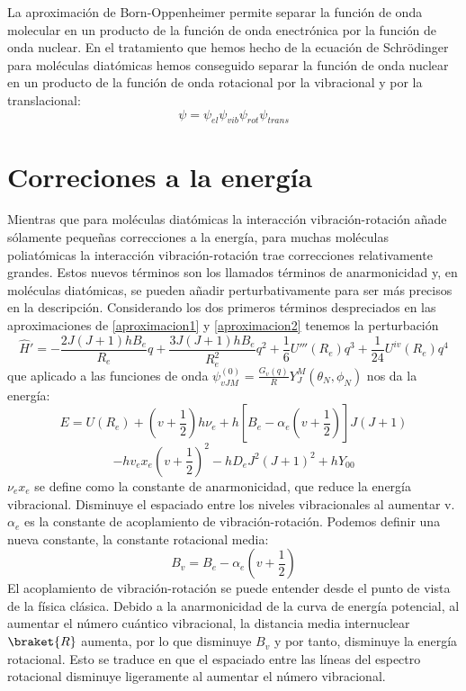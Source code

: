 \documentclass[a4paper]{article}
\begin{document}
La aproximación de Born-Oppenheimer permite separar la función de onda molecular en un producto de la función de onda enectrónica por la función de onda nuclear. En el tratamiento que hemos hecho de la ecuación de Schrödinger para moléculas diatómicas hemos conseguido separar la función de onda nuclear en un producto de la función de onda rotacional por la vibracional y por la translacional:
\begin{equation}
\psi=\psi_{el}\psi_{vib}\psi_{rot}\psi_{trans}
\end{equation}

\section{Correciones a la energía}
Mientras que para moléculas diatómicas la interacción vibración-rotación añade sólamente pequeñas correcciones a la energía, para muchas moléculas poliatómicas la interacción vibración-rotación trae correcciones relativamente grandes. Estos nuevos términos son los llamados términos de anarmonicidad y, en moléculas diatómicas, se pueden añadir perturbativamente para ser más precisos en la descripción. Considerando los dos primeros términos despreciados en las aproximaciones de {\ref{aproximacion1} y \ref{aproximacion2} tenemos la perturbación
\begin{equation}
\hat H'=-\frac{2J(J+1)hB_e}{R_e}q +\frac{3J(J+1)hB_e}{R^2_e}q^2+\frac{1}{6}U'''(R_e)q^3+\frac{1}{24}U^{iv}(R_e)q^4
\end{equation}
que aplicado a las funciones de onda $\psi_{vJM}^{(0)}=\frac{G_v(q)}{R}Y_J^M(\theta_N,\phi_N)$ nos da la energía:
$$
E=U(R_e)+\left(v+\frac{1}{2}\right)h\nu_e+h\left[B_e-\alpha_e\left(v+\frac{1}{2}\right)\right]J(J+1)
$$
\begin{equation}
-hv_ex_e\left(v+\frac{1}{2}\right)^2-hD_eJ^2(J+1)^2 +hY_{00}
\end{equation}
$\nu_ex_e$ se define como la constante de anarmonicidad, que reduce la energía vibracional. Disminuye el espaciado entre los niveles vibracionales al aumentar v. $\alpha_e$ es la constante de acoplamiento de vibración-rotación. Podemos definir una nueva constante, la constante rotacional media: 
\begin{equation}
B_v=B_e-\alpha_e\left(v+\frac{1}{2}\right)
\end{equation} 
El acoplamiento de vibración-rotación se puede entender desde el punto de vista de la física clásica. Debido a la anarmonicidad de la curva de energía potencial, al aumentar el número cuántico vibracional, la distancia media internuclear $\braket{R}$ aumenta, por lo que disminuye $B_v$ y por tanto, disminuye la energía rotacional. Esto se traduce en que el espaciado entre las líneas del espectro rotacional disminuye ligeramente al aumentar el número vibracional.\\

}
\end{document}
